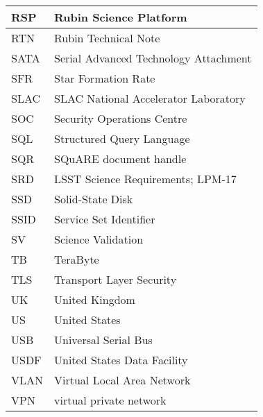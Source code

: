 \begin{longtable}{p{}p{}}
RSP & Rubin Science Platform \\\hline
RTN & Rubin Technical Note \\\hline
SATA & Serial Advanced Technology Attachment \\\hline
SFR & Star Formation Rate \\\hline
SLAC & SLAC National Accelerator Laboratory \\\hline
SOC & Security Operations Centre \\\hline
SQL & Structured Query Language \\\hline
SQR & SQuARE document handle \\\hline
SRD & LSST Science Requirements; LPM-17 \\\hline
SSD & Solid-State Disk \\\hline
SSID & Service Set Identifier \\\hline
SV & Science Validation \\\hline
TB & TeraByte \\\hline
TLS & Transport Layer Security \\\hline
UK & United Kingdom \\\hline
US & United States \\\hline
USB & Universal Serial Bus \\\hline
USDF & United States Data Facility \\\hline
VLAN &  Virtual Local Area Network \\\hline
VPN & virtual private network \\\hline
\end{longtable}

